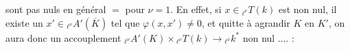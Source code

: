 sont pas nuls en général $=$ pour $\nu=1$. En effet,
si  $x\in{}_{\ell^\nu}T(k)$ est non nul, il existe un
$x'\in{}_{\ell^\nu}A'(\overline K)$ tel que \deleted{$\unsure{\varphi|\ell^\nu|\xi}$} $\varphi(x,x')\ne0$, et  quitte
à agrandir $K$ en $K'$, on aura donc un
accouplement ${}_{\ell^\nu}A'(K)\times{}_{\ell^\nu}T(k)\longrightarrow{}_{\ell^\nu}k^*$ non nul .... :
